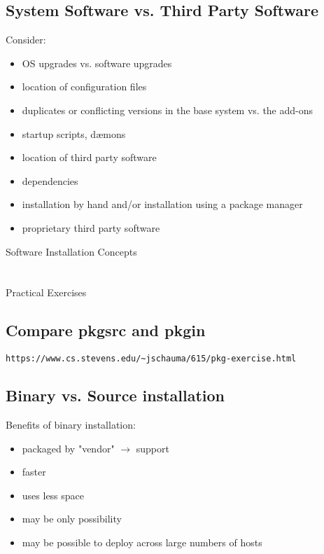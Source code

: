\documentclass[xga]{xdvislides}
\begin{document}
\subsection{System Software vs. Third Party Software}
Consider:
\begin{itemize}
	\item OS upgrades vs. software upgrades
	\item location of configuration files
	\item duplicates or conflicting versions in the base system vs. the
		add-ons
	\item startup scripts, d{\ae}mons
	\item location of third party software
	\item dependencies
	\item installation by hand and/or installation using a package manager
	\item proprietary third party software
\end{itemize}


\newpage
\vspace*{\fill}
\begin{center}
	\Hugesize
		Software Installation Concepts \\ [1em]
	\hspace*{5mm}
	\blueline\\
	\hspace*{5mm}\\
		Practical Exercises
\end{center}
\vspace*{\fill}

\subsection{Compare pkgsrc and pkgin}
\vfill
{\tt https://www.cs.stevens.edu/\~{}jschauma/615/pkg-exercise.html}
\vfill

\subsection{Binary vs. Source installation}
Benefits of binary installation:
\begin{itemize}
	\item packaged by "vendor" $\rightarrow$ support
	\item faster
	\item uses less space
	\item may be only possibility
	\item may be possible to deploy across large numbers of hosts
\end{itemize}
\end{document}
